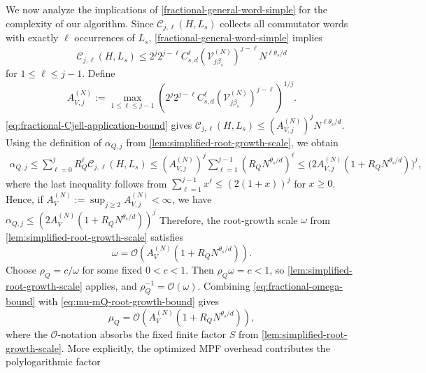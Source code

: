 \documentclass[10pt,reqno]{article}
\numberwithin{equation}{section}
\theoremstyle{plain}
\theoremstyle{definition}
\begin{document}
We now analyze the implications of \cref{fractional-general-word-simple} for the complexity of our algorithm. Since \(\mathcal C_{j,\ell}(H,L_s)\) collects all commutator words with exactly \(\ell\) occurrences of \(L_s\), \cref{fractional-general-word-simple} implies
\begin{equation}\label{eq:fractional-Cjell-application-bound}
\mathcal C_{j,\ell}(H,L_s) \leq 2^j 2^{j-\ell} C_{s,d}^{\ell} (\mathcal V_{j\beta_s}^{(N)})^{j-\ell} N^{\ell\theta_s/d}
\end{equation}
for \(1\leq \ell\leq j-1\). %
Define
\begin{equation}\label{eq:fractional-Aj-def}
A_{V,j}^{(N)} := \max_{1\leq \ell\leq j-1} \left( 2^j 2^{j-\ell} C_{s,d}^{\ell}  (\mathcal V_{j\beta_s}^{(N)})^{j-\ell} \right)^{1/j}.
\end{equation}
\cref{eq:fractional-Cjell-application-bound} gives $\mathcal C_{j,\ell}(H,L_s) \leq (A_{V,j}^{(N)})^j N^{\ell\theta_s/d}$. Using the definition of \(\alpha_{Q,j}\) from \cref{lem:simplified-root-growth-scale}, we obtain
\begin{align}
\alpha_{Q,j}\le \sum_{\ell=0}^{j} R_Q^\ell \mathcal C_{j,\ell}(H,L_s)\le (A_{V,j}^{(N)})^j\sum_{\ell=1}^{j-1}(R_QN^{\theta_s/d})^\ell\le \bigl(2A_{V,j}^{(N)}(1+R_QN^{\theta_s/d})\bigr)^j,
\end{align}
where the last inequality follows from \(\sum_{\ell=1}^{j-1}x^\ell\leq (2(1+x))^j\) for \(x\geq0\). Hence, if \(A_V^{(N)} := \sup_{j\ge 2} A_{V,j}^{(N)} < \infty\), we have $\alpha_{Q,j} \leq ( 2A_V^{(N)} (1+R_QN^{\theta_s/d} ) )^j$ Therefore, the root-growth scale \(\omega\) from \cref{lem:simplified-root-growth-scale} satisfies
\begin{equation}\label{eq:fractional-omega-bound}
\omega = \mathcal O ( A_V^{(N)} (1+R_QN^{\theta_s/d}) ).
\end{equation}
Choose \(\rho_Q=c/\omega\) for some fixed \(0<c<1\). Then \(\rho_Q\omega=c<1\), so \cref{lem:simplified-root-growth-scale} applies, and \(\rho_Q^{-1}=\mathcal O(\omega)\). Combining \cref{eq:fractional-omega-bound} with \cref{eq:mu-mQ-root-growth-bound} gives
\begin{equation}\label{eq:fractional-muQ-scale}
\mu_Q = \mathcal {O} ( A_V^{(N)} (1+R_QN^{\theta_s/d})),
\end{equation}
where the \(\mathcal O\)-notation absorbs the fixed finite factor \(S\) from \cref{lem:simplified-root-growth-scale}. More explicitly, the optimized MPF overhead contributes the polylogarithmic factor
\end{document}
